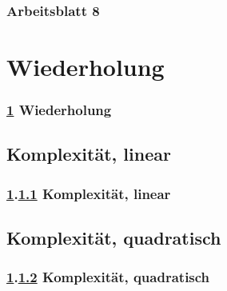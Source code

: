 \documentclass[9pt,german]{beamer}%
\begin{document}
\maketitle%
\addtocounter{framenumber}{-1}%

\begin{frame}
  \frametitle{Arbeitsblatt 8}%
\tableofcontents
\end{frame}


\section{Wiederholung}\label{K:wdh}
\begin{frame}
  \frametitle{\ref{K:wdh} Wiederholung}%
\tableofcontents[current]
\end{frame}

\def\stitle{Komplexit\"at, linear}
\subsection{\stitle}\label{S:Lin}
\begin{frame}[t]%
  \frametitle{\ref{K:wdh}.\ref{S:Lin} \stitle}
\medskip




\end{frame}


\def\stitle{Komplexit\"at, quadratisch}
\subsection{\stitle}\label{S:Quad}
\begin{frame}[t]%
  \frametitle{\ref{K:wdh}.\ref{S:Quad} \stitle}
\medskip


\end{frame}
\end{document}
